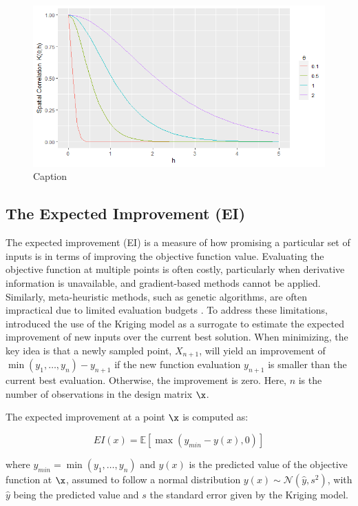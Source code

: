 \documentclass [PhD] {package/uclathes}
\begin{document}
\begin{figure}
    \centering
    \includegraphics{chapters/RSO/pdfs/matern correlation.png}
    \caption{Caption}
    \label{fig:matern}
\end{figure}


\subsection{The Expected Improvement (EI)}
The expected improvement (EI) is a measure of how promising a particular set of inputs is in terms of improving the objective function value. Evaluating the objective function at multiple points is often costly, particularly when derivative information is unavailable, and gradient-based methods cannot be applied. Similarly, meta-heuristic methods, such as genetic algorithms, are often impractical due to limited evaluation budgets \parencite{roustant2012dicekriging}. To address these limitations, \textcite{jones1998efficient} introduced the use of the Kriging model as a surrogate to estimate the expected improvement of new inputs over the current best solution. When minimizing, the key idea is that a newly sampled point, \( X_{n+1} \), will yield an improvement of \(\min(y_1, \dots, y_n) - y_{n+1}\) if the new function evaluation \(y_{n+1}\) is smaller than the current best evaluation. Otherwise, the improvement is zero. Here, \(n\) is the number of observations in the design matrix \(\x\).

The expected improvement at a point \(\x\) is computed as:

\[
EI(x) = \mathbb{E}\left[\max(y_{min} - y(x), 0)\right]
\]

where \(y_{min} = \min(y_1, \dots, y_n)\) and \(y(x)\) is the predicted value of the objective function at \(\x\), assumed to follow a normal distribution \(y(x) \sim \mathcal{N}(\hat{y}, s^2)\), with \(\hat{y}\) being the predicted value and \(s\) the standard error given by the Kriging model.
\end{document}
